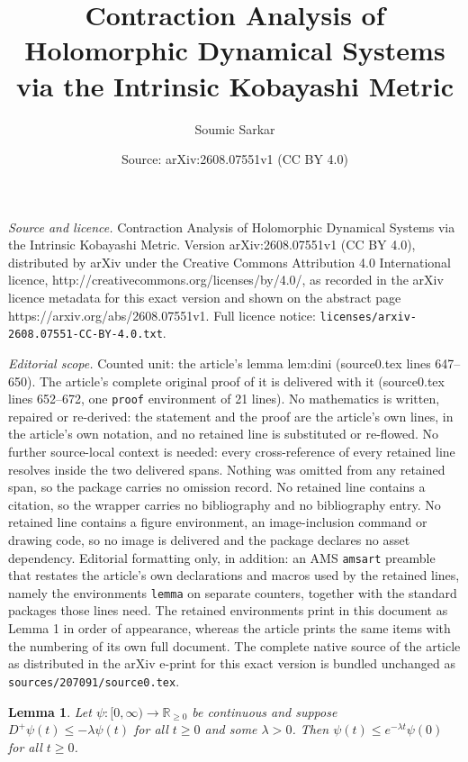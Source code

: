 \documentclass[10pt,a4paper]{amsart}
\title{Contraction Analysis of Holomorphic Dynamical Systems via the Intrinsic Kobayashi Metric}
\author{Soumic Sarkar}
\date{Source: arXiv:2608.07551v1 (CC BY 4.0)}
\newtheorem{lemma}{Lemma}
\begin{document}
\maketitle

\noindent\emph{Source and licence.} Contraction Analysis of Holomorphic Dynamical Systems via the Intrinsic Kobayashi Metric. Version arXiv:2608.07551v1 (CC BY 4.0), distributed by arXiv under the Creative Commons Attribution 4.0 International licence, http://creativecommons.org/licenses/by/4.0/, as recorded in the arXiv licence metadata for this exact version and shown on the abstract page https://arxiv.org/abs/2608.07551v1. Full licence notice: \texttt{licenses/arxiv-2608.07551-CC-BY-4.0.txt}.\par\smallskip

\noindent\textit{Editorial scope.} Counted unit: the article's lemma lem:dini (source0.tex lines 647--650). The article's complete original proof of it is delivered with it (source0.tex lines 652--672, one \texttt{proof} environment of 21 lines). No mathematics is written, repaired or re-derived: the statement and the proof are the article's own lines, in the article's own notation, and no retained line is substituted or re-flowed.  No further source-local context is needed: every cross-reference of every retained line resolves inside the two delivered spans.  Nothing was omitted from any retained span, so the package carries no omission record.  No retained line contains a citation, so the wrapper carries no bibliography and no bibliography entry.  No retained line contains a figure environment, an image-inclusion command or drawing code, so no image is delivered and the package declares no asset dependency.  Editorial formatting only, in addition: an AMS \texttt{amsart} preamble that restates the article's own declarations and macros used by the retained lines, namely the environments \texttt{lemma} on separate counters, together with the standard packages those lines need.  The retained environments print in this document as Lemma 1 in order of appearance, whereas the article prints the same items with the numbering of its own full document.  The complete native source of the article as distributed in the arXiv e-print for this exact version is bundled unchanged as \texttt{sources/207091/source0.tex}.
\begin{lemma}
\label{lem:dini}
Let $\psi:[0,\infty)\to\mathbb{R}_{\ge0}$ be continuous and suppose $D^+\psi(t)\le-\lambda\psi(t)$ for all $t\ge0$ and some $\lambda>0$. Then $\psi(t)\le e^{-\lambda t}\psi(0)$ for all $t\ge0$.
\end{lemma}
\end{document}
